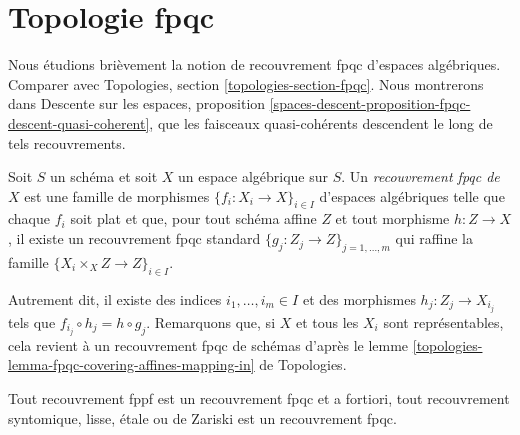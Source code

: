 \section{Topologie fpqc}
\label{section-fpqc}

\noindent
Nous étudions brièvement la notion de recouvrement fpqc d'espaces algébriques.
Comparer avec
Topologies, section \ref{topologies-section-fpqc}.
Nous montrerons dans
Descente sur les espaces,
proposition \ref{spaces-descent-proposition-fpqc-descent-quasi-coherent},
que les faisceaux quasi-cohérents descendent le long de tels recouvrements.

\begin{definition}
\label{definition-fpqc-covering}
Soit $S$ un schéma et soit $X$ un espace algébrique sur $S$.
Un {\it recouvrement fpqc de $X$} est une famille de morphismes
$\{f_i : X_i \to X\}_{i \in I}$ d'espaces algébriques
telle que chaque $f_i$ soit plat et que, pour tout schéma affine
$Z$ et tout morphisme $h : Z \to X$, il existe un recouvrement fpqc standard
$\{g_j : Z_j \to Z\}_{j = 1, \ldots, m}$ qui raffine la famille
$\{X_i \times_X Z \to Z\}_{i \in I}$.
\end{definition}

\noindent
Autrement dit, il existe des indices $i_1, \ldots, i_m \in I$ et des
morphismes $h_j : Z_j \to X_{i_j}$ tels que
$f_{i_j} \circ h_j = h \circ g_j$. Remarquons que, si $X$ et tous les $X_i$ sont
représentables, cela revient à un recouvrement fpqc de schémas d'après le
lemme \ref{topologies-lemma-fpqc-covering-affines-mapping-in} de Topologies.

\begin{lemma}
\label{lemma-zariski-etale-smooth-syntomic-fppf-fpqc}
Tout recouvrement fppf est un recouvrement fpqc et a fortiori,
tout recouvrement syntomique, lisse, \'etale ou de Zariski est un recouvrement fpqc.
\end{lemma}

